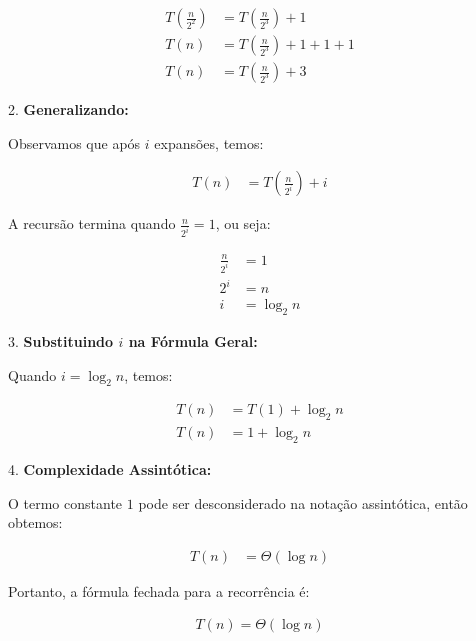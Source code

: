 \documentclass{article}
\begin{document}
   \begin{align*}
       T\left(\frac{n}{2^2}\right) &= T\left(\frac{n}{2^3}\right) + 1 \\
       T(n) &= T\left(\frac{n}{2^3}\right) + 1 + 1 + 1 \\
       T(n) &= T\left(\frac{n}{2^3}\right) + 3
   \end{align*}

2. \textbf{Generalizando:}

   Observamos que após \(i\) expansões, temos:

   \begin{align*}
       T(n) &= T\left(\frac{n}{2^i}\right) + i
   \end{align*}

   A recursão termina quando \( \frac{n}{2^i} = 1 \), ou seja:

   \begin{align*}
       \frac{n}{2^i} &= 1 \\
       2^i &= n \\
       i &= \log_2 n
   \end{align*}

3. \textbf{Substituindo \(i\) na Fórmula Geral:}

   Quando \( i = \log_2 n \), temos:

   \begin{align*}
       T(n) &= T(1) + \log_2 n \\
       T(n) &= 1 + \log_2 n
   \end{align*}

4. \textbf{Complexidade Assintótica:}

   O termo constante \(1\) pode ser desconsiderado na notação assintótica, então obtemos:

   \begin{align*}
       T(n) &= \Theta(\log n)
   \end{align*}

Portanto, a fórmula fechada para a recorrência é:

\begin{align*}
    \boxed{T(n) = \Theta(\log n)}
\end{align*}
\end{document}
